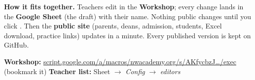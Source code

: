 \documentclass[10pt]{article}
\begin{document}

\textbf{How it fits together.} Teachers edit in the \textbf{Workshop}; every change lands in the
\textbf{Google Sheet} (the draft) with their name. Nothing public changes until you click
. Then the \textbf{public site} (parents, deans, admission, students,
Excel download, practice links) updates in a minute. Every published version is kept on GitHub.
\par\smallskip
{\small \textbf{Workshop:} \href{https://script.google.com/a/macros/nwacademy.org/s/AKfycbzJEKrTwjxh110-Bu-ixQHpJGkTp86txvT4JNH9YzL0R-NUxUEWd8y9nwudJxMgcOx6/exec}{script.google.com/a/macros/nwacademy.org/s/AKfycbzJ\ldots/exec} (bookmark it)
\quad \textbf{Teacher list:} Sheet $\to$ \emph{Config} $\to$ \emph{editors}}
\end{document}
